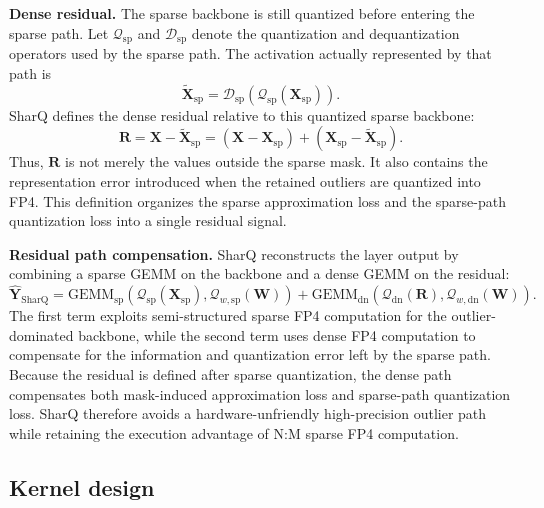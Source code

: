 \documentclass{article}
\begin{document}
\textbf{Dense residual.}
The sparse backbone is still quantized before entering the sparse path. Let
$\mathcal{Q}_{\mathrm{sp}}$ and $\mathcal{D}_{\mathrm{sp}}$ denote the
quantization and dequantization operators used by the sparse path. The activation
actually represented by that path is
\begin{equation}
  \widetilde{\mathbf{X}}_{\mathrm{sp}}
  =
  \mathcal{D}_{\mathrm{sp}}
  \left(
    \mathcal{Q}_{\mathrm{sp}}(\mathbf{X}_{\mathrm{sp}})
  \right).
  \label{eq:sharq-quantized-backbone}
\end{equation}
SharQ defines the dense residual relative to this quantized sparse backbone:
\begin{equation}
  \mathbf{R}
  =
  \mathbf{X} - \widetilde{\mathbf{X}}_{\mathrm{sp}}
  =
  (\mathbf{X} - \mathbf{X}_{\mathrm{sp}})
  +
  (\mathbf{X}_{\mathrm{sp}} - \widetilde{\mathbf{X}}_{\mathrm{sp}}).
  \label{eq:sharq-residual}
\end{equation}
Thus, $\mathbf{R}$ is not merely the values outside the sparse mask. It also
contains the representation error introduced when the retained outliers are
quantized into FP4. This definition organizes the sparse approximation loss and
the sparse-path quantization loss into a single residual signal.

\textbf{Residual path compensation.}
SharQ reconstructs the layer output by combining a sparse GEMM on the backbone
and a dense GEMM on the residual:
\begin{equation}
  \widehat{\mathbf{Y}}_{\mathrm{SharQ}}
  =
  \mathrm{GEMM}_{\mathrm{sp}}
  \left(
    \mathcal{Q}_{\mathrm{sp}}(\mathbf{X}_{\mathrm{sp}}),
    \mathcal{Q}_{w,\mathrm{sp}}(\mathbf{W})
  \right)
  +
  \mathrm{GEMM}_{\mathrm{dn}}
  \left(
    \mathcal{Q}_{\mathrm{dn}}(\mathbf{R}),
    \mathcal{Q}_{w,\mathrm{dn}}(\mathbf{W})
  \right).
  \label{eq:sharq-output}
\end{equation}
The first term exploits semi-structured sparse FP4 computation for the
outlier-dominated backbone, while the second term uses dense FP4 computation to
compensate for the information and quantization error left by the sparse path.
Because the residual is defined after sparse quantization, the dense path
compensates both mask-induced approximation loss and sparse-path quantization
loss. SharQ therefore avoids a hardware-unfriendly high-precision outlier path
while retaining the execution advantage of N:M sparse FP4 computation.

\subsection{Kernel design}
\end{document}
